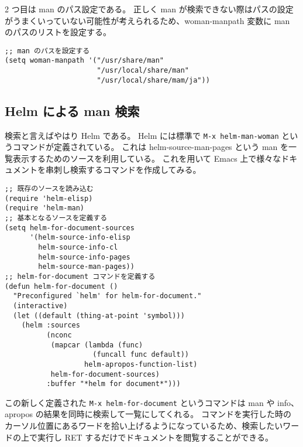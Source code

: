 2 つ目は man のパス設定である。
正しく man が検索できない際はパスの設定がうまくいっていない可能性が考えられるため、woman-manpath 変数に man のパスのリストを設定する。
\begin{mdframed}[roundcorner=0.50zw,leftmargin=3.00zw,rightmargin=3.00zw,skipabove=0.40zw,skipbelow=0.40zw,innertopmargin=4.00pt,innerbottommargin=4.00pt,innerleftmargin=5.00pt,innerrightmargin=5.00pt,linecolor=gray!020,linewidth=0.50pt,backgroundcolor=gray!20]
\begin{verbatim}
;; man のパスを設定する
(setq woman-manpath '("/usr/share/man"
                      "/usr/local/share/man"
                      "/usr/local/share/mam/ja"))
\end{verbatim}
\end{mdframed}
\subsection{Helm による man 検索}
検索と言えばやはり Helm である。
Helm には標準で \texttt{M-x helm-man-woman} というコマンドが定義されている。
これは helm-source-man-pages という man を一覧表示するためのソースを利用している。
これを用いて Emacs 上で様々なドキュメントを串刺し検索するコマンドを作成してみる。
\begin{mdframed}[roundcorner=0.50zw,leftmargin=3.00zw,rightmargin=3.00zw,skipabove=0.40zw,skipbelow=0.40zw,innertopmargin=4.00pt,innerbottommargin=4.00pt,innerleftmargin=5.00pt,innerrightmargin=5.00pt,linecolor=gray!020,linewidth=0.50pt,backgroundcolor=gray!20]
\begin{verbatim}
;; 既存のソースを読み込む
(require 'helm-elisp)
(require 'helm-man)
;; 基本となるソースを定義する
(setq helm-for-document-sources
      '(helm-source-info-elisp
        helm-source-info-cl
        helm-source-info-pages
        helm-source-man-pages))
;; helm-for-document コマンドを定義する
(defun helm-for-document ()
  "Preconfigured `helm' for helm-for-document."
  (interactive)
  (let ((default (thing-at-point 'symbol)))
    (helm :sources
          (nconc
           (mapcar (lambda (func)
                     (funcall func default))
                   helm-apropos-function-list)
           helm-for-document-sources)
          :buffer "*helm for document*")))
\end{verbatim}
\end{mdframed}
この新しく定義された \texttt{M-x helm-for-document} というコマンドは man や info、apropos の結果を同時に検索して一覧にしてくれる。
コマンドを実行した時のカーソル位置にあるワードを拾い上げるようになっているため、検索したいワードの上で実行し RET するだけでドキュメントを閲覧することができる。
